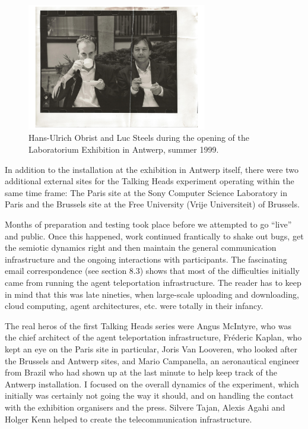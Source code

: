 \begin{figure}[htbp]
  \centerline{\includegraphics[width=0.7\textwidth]{chap8/figures/hu-obrist+ls.pdf}}
\caption{\label{fig:faces}Hans-Ulrich Obrist and Luc Steels during the opening of the Laboratorium Exhibition in Antwerp, summer 1999. }
\end{figure}
In addition to the installation at the exhibition in Antwerp itself, there were two additional 
external sites for the Talking Heads experiment operating within the same time frame: The Paris site at the Sony Computer 
Science Laboratory in Paris and the Brussels site at the Free University (Vrije Universiteit) of Brussels.

Months of preparation and testing took place before we attempted to go ``live'' and public. 
Once this happened, work continued frantically to shake out bugs, get the semiotic dynamics right
and then maintain the general communication infrastructure and the ongoing interactions with participants. 
The fascinating email correspondence (see section 8.3) shows that most of the difficulties initially came 
from running the agent teleportation infrastructure. The reader has to keep in mind that this was 
late nineties, when large-scale uploading 
and downloading, cloud computing, agent architectures, etc. were totally in their infancy. 

The real heros of the first Talking Heads series were
Angus McIntyre, who was the chief architect of the agent teleportation infrastructure, 
Fr\'{e}deric Kaplan, who kept an eye on the Paris site in particular, Joris Van Looveren, who looked after the 
Brussels and Antwerp sites, and Mario Campanella, an aeronautical engineer from Brazil who 
had shown up at the last minute to 
help keep track of the Antwerp installation. I focused on the overall dynamics of the experiment, which 
initially was certainly not going the way it should, and on handling the contact with the exhibition organisers and 
the press. Silvere Tajan, Alexis Agahi and Holger Kenn helped to create the telecommunication infrastructure. 
